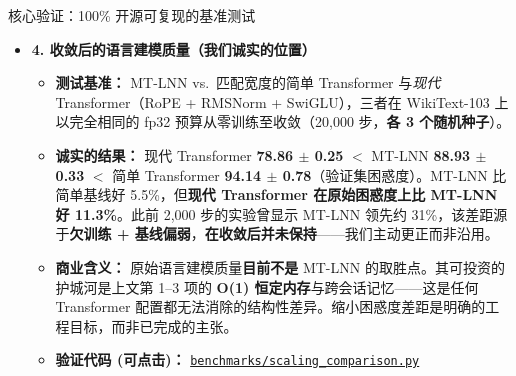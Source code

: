 ﻿\documentclass[aspectratio=169, 10pt]{beamer}
\begin{document}
\begin{frame}[allowframebreaks]{核心验证：100\% 开源可复现的基准测试}
\begin{itemize}
    \begin{itemize}
        \item \textbf{测试基准：} 严格禁用一切 GPU 显卡，仅以最劣势的纯 CPU 运行。
        \item \textbf{商业意义：} 机器靠“仿生睡眠”主动跳过绝对的无效计算，推理速度直接 \textbf{逆势提升了 13\%+}。这意味着未来企业在铺设几十万台本地智能设备时，可以彻底省去购买昂贵 AI 加速卡的绝大部分天价成本。
        \item \textbf{验证代码 (可点击)：} \href{https://github.com/everest-an/M1/blob/main/benchmarks/sparse_resonance_ablation.py}{\texttt{benchmarks/sparse\_resonance\_ablation.py}}
    \end{itemize}
    \vspace{0.4em}
    \item \textbf{4. 收敛后的语言建模质量（我们诚实的位置）}
    \begin{itemize}
        \item \textbf{测试基准：} MT-LNN vs.\ 匹配宽度的简单 Transformer 与\emph{现代} Transformer（RoPE + RMSNorm + SwiGLU），三者在 WikiText-103 上以完全相同的 fp32 预算从零训练至收敛（20,000 步，\textbf{各 3 个随机种子}）。
        \item \textbf{诚实的结果：} 现代 Transformer \textbf{78.86 $\pm$ 0.25} $<$ MT-LNN \textbf{88.93 $\pm$ 0.33} $<$ 简单 Transformer \textbf{94.14 $\pm$ 0.78}（验证集困惑度）。MT-LNN 比简单基线好 5.5\%，但\textbf{现代 Transformer 在原始困惑度上比 MT-LNN 好 11.3\%}。此前 2,000 步的实验曾显示 MT-LNN 领先约 31\%，该差距源于\textbf{欠训练 + 基线偏弱}，\textbf{在收敛后并未保持}——我们主动更正而非沿用。
        \item \textbf{商业含义：} 原始语言建模质量\textbf{目前不是} MT-LNN 的取胜点。其可投资的护城河是上文第 1--3 项的 \textbf{O(1) 恒定内存}与跨会话记忆——这是任何 Transformer 配置都无法消除的结构性差异。缩小困惑度差距是明确的工程目标，而非已完成的主张。
        \item \textbf{验证代码 (可点击)：} \href{https://github.com/everest-an/M1/blob/main/benchmarks/scaling_comparison.py}{\texttt{benchmarks/scaling\_comparison.py}}
    \end{itemize}
\end{itemize}
\end{frame}
\end{document}
